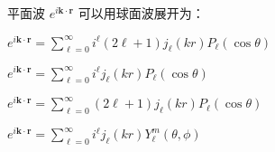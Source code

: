 \documentclass{njustexam}
\begin{document}
  \begin{problem}
    平面波 $e^{i\mathbf{k} \cdot \mathbf{r}}$ 可以用球面波展开为：
    \begin{abcd}
    \item $e^{i\mathbf{k} \cdot \mathbf{r}} = \sum_{\ell=0}^{\infty} i^{\ell} (2\ell+1) j_{\ell}(kr) P_{\ell}(\cos \theta)$
    \item $e^{i\mathbf{k} \cdot \mathbf{r}} = \sum_{\ell=0}^{\infty} i^{\ell} j_{\ell}(kr) P_{\ell}(\cos \theta)$
    \item $e^{i\mathbf{k} \cdot \mathbf{r}} = \sum_{\ell=0}^{\infty} (2\ell+1) j_{\ell}(kr) P_{\ell}(\cos \theta)$
    \item $e^{i\mathbf{k} \cdot \mathbf{r}} = \sum_{\ell=0}^{\infty} i^{\ell} j_{\ell}(kr) Y_{\ell}^{m}(\theta, \phi)$
    \end{abcd}
    \end{problem}


    
    
    






\end{document}
